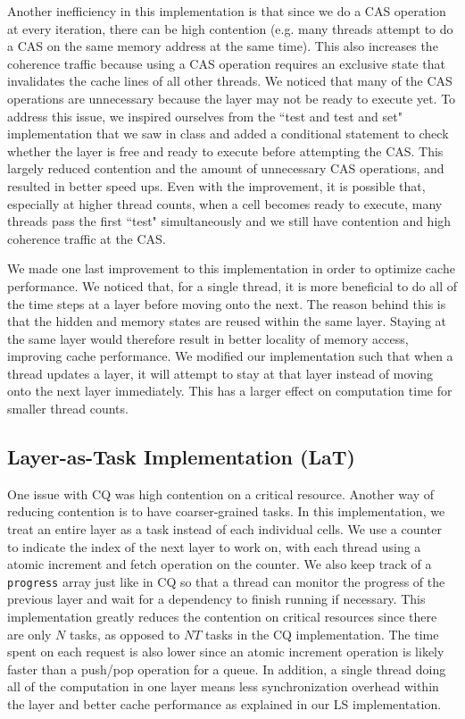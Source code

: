 \documentclass[12pt]{article}
\begin{document}
Another inefficiency in this implementation is that since we do a CAS operation at every iteration, there can be high contention (e.g. many threads attempt to do a CAS on the same memory address at the same time).
This also increases the coherence traffic because using a CAS operation requires an exclusive state that invalidates the cache lines of all other threads.
We noticed that many of the CAS operations are unnecessary because the layer may not be ready to execute yet.
To address this issue, we inspired ourselves from the ``test and test and set" implementation that we saw in class and added a conditional statement to check whether the layer is free and ready to execute before attempting the CAS.
This largely reduced contention and the amount of unnecessary CAS operations, and resulted in better speed ups.
Even with the improvement, it is possible that, especially at higher thread counts, when a cell becomes ready to execute, many threads pass the first ``test" simultaneously and we still have contention and high coherence traffic at the CAS.

We made one last improvement to this implementation in order to optimize cache performance.
We noticed that, for a single thread, it is more beneficial to do all of the time steps at a layer before moving onto the next.
The reason behind this is that the hidden and memory states are reused within the same layer.
Staying at the same layer would therefore result in better locality of memory access, improving cache performance.
We modified our implementation such that when a thread updates a layer, it will attempt to stay at that layer instead of moving onto the next layer immediately.
This has a larger effect on computation time for smaller thread counts.

\subsection{Layer-as-Task Implementation (LaT)}

One issue with CQ was high contention on a critical resource.
Another way of reducing contention is to have coarser-grained tasks.
In this implementation, we treat an entire layer as a task instead of each individual cells.
We use a counter to indicate the index of the next layer to work on, with each thread using a atomic increment and fetch operation on the counter.
We also keep track of a \verb|progress| array just like in CQ so that a thread can monitor the progress of the previous layer and wait for a dependency to finish running if necessary.
This implementation greatly reduces the contention on critical resources since there are only $N$ tasks, as opposed to $NT$ tasks in the CQ implementation.
The time spent on each request is also lower since an atomic increment operation is likely faster than a push/pop operation for a queue.
In addition, a single thread doing all of the computation in one layer means less synchronization overhead within the layer and better cache performance as explained in our LS implementation.
\end{document}
